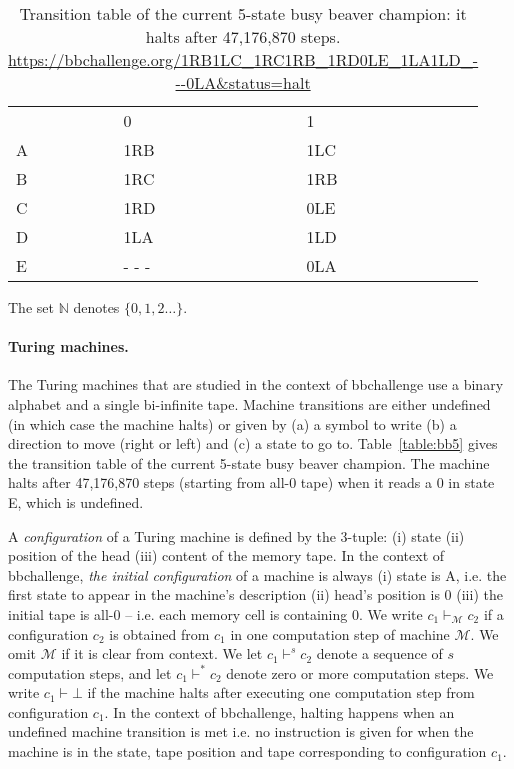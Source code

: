 \documentclass[a4paper,british]{article}
\theoremstyle{definition} %
\numberwithin{equation}{section}
\theoremstyle{definition} %
\begin{document}
\begin{table}[h!]
  \centering
  \begin{tabular}{lll}
      & 0     & 1   \\
    A & 1RB   & 1LC \\
    B & 1RC   & 1RB \\
    C & 1RD   & 0LE \\
    D & 1LA   & 1LD \\
    E & - - - & 0LA
  \end{tabular}
  \caption{Transition table of the current 5-state busy beaver champion: it halts after 47,176,870 steps.\\\url{https://bbchallenge.org/1RB1LC_1RC1RB_1RD0LE_1LA1LD_---0LA&status=halt}}
\end{table}\label{table:bb5}

The set $\mathbb{N}$ denotes $\{0,1,2\dots\}$.

\paragraph*{Turing machines.}The Turing machines that are studied in the context of bbchallenge use a binary alphabet and a single bi-infinite tape. Machine transitions are either undefined (in which case the machine halts) or given by (a) a symbol to write (b) a direction to move (right or left) and (c) a state to go to. Table~\ref{table:bb5} gives the transition table of the current 5-state busy beaver champion. The machine halts after 47,176,870 steps (starting from all-0 tape) when it reads a 0 in state E, which is undefined.

A \textit{configuration} of a Turing machine is defined by the 3-tuple: (i) state (ii) position of the head (iii) content of the memory tape. In the context of bbchallenge, \textit{the initial configuration} of a machine is always (i) state is A, i.e. the first state to appear in the machine's description (ii) head's position is 0 (iii) the initial tape is all-0 -- i.e. each memory cell is containing 0. We write $c_1 \vdash_\mathcal{M} c_2$ if a configuration $c_2$ is obtained from $c_1$ in one computation step of machine $\mathcal{M}$. We omit $\mathcal{M}$ if it is clear from context. We let $c_1 \vdash^s c_2$ denote a sequence of $s$ computation steps, and let $c_1 \vdash^* c_2$ denote zero or more computation steps. %
We write $c_1 \vdash \bot$ if the machine halts after executing one computation step from configuration $c_1$. In the context of bbchallenge, halting happens when an undefined machine transition is met i.e. no instruction is given for when the machine is in the state, tape position and tape corresponding to configuration $c_1$.
\end{document}
